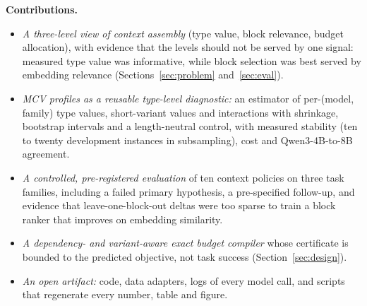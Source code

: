 \textbf{Contributions.}
\begin{itemize}
\item \emph{A three-level view of context assembly} (type value, block relevance, budget allocation), with evidence that
the levels should not be served by one signal: measured type value was informative, while block selection was best served
by embedding relevance (Sections~\ref{sec:problem} and~\ref{sec:eval}).
\item \emph{MCV profiles as a reusable type-level diagnostic:} an estimator of per-(model, family) type values,
short-variant values and interactions with shrinkage, bootstrap intervals and a length-neutral control, with measured
stability (ten to twenty development instances in subsampling), cost and Qwen3-4B-to-8B agreement.
\item \emph{A controlled, pre-registered evaluation} of ten context policies on three task families, including a failed
primary hypothesis, a pre-specified follow-up, and evidence that leave-one-block-out deltas were too sparse to train a
block ranker that improves on embedding similarity.
\item \emph{A dependency- and variant-aware exact budget compiler} whose certificate is bounded to the predicted
objective, not task success (Section~\ref{sec:design}).
\item \emph{An open artifact:} code, data adapters, logs of every model call, and scripts that regenerate every number,
table and figure.
\end{itemize}
